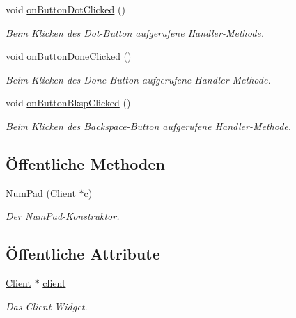 \begin{DoxyCompactItemize}
void \hyperlink{class_num_pad_a153332f9a9b050037329d054d8cac6ae}{on\+Button\+Dot\+Clicked} ()
\begin{DoxyCompactList}\small\item\em Beim Klicken des Dot-\/\+Button aufgerufene Handler-\/\+Methode. \end{DoxyCompactList}\item 
\hypertarget{class_num_pad_abc4841a30a7777e207aebeb6020d9194}{}\label{class_num_pad_abc4841a30a7777e207aebeb6020d9194} 
void \hyperlink{class_num_pad_abc4841a30a7777e207aebeb6020d9194}{on\+Button\+Done\+Clicked} ()
\begin{DoxyCompactList}\small\item\em Beim Klicken des Done-\/\+Button aufgerufene Handler-\/\+Methode. \end{DoxyCompactList}\item 
\hypertarget{class_num_pad_a8e5af4566f4c3e5574a6867877ee795b}{}\label{class_num_pad_a8e5af4566f4c3e5574a6867877ee795b} 
void \hyperlink{class_num_pad_a8e5af4566f4c3e5574a6867877ee795b}{on\+Button\+Bksp\+Clicked} ()
\begin{DoxyCompactList}\small\item\em Beim Klicken des Backspace-\/\+Button aufgerufene Handler-\/\+Methode. \end{DoxyCompactList}\end{DoxyCompactItemize}
\subsection*{Öffentliche Methoden}
\begin{DoxyCompactItemize}
\item 
\hyperlink{class_num_pad_ac35bfd6bb99a182c9073d80a09f3baf9}{Num\+Pad} (\hyperlink{class_client}{Client} $\ast$c)
\begin{DoxyCompactList}\small\item\em Der Num\+Pad-\/\+Konstruktor. \end{DoxyCompactList}\end{DoxyCompactItemize}
\subsection*{Öffentliche Attribute}
\begin{DoxyCompactItemize}
\item 
\hypertarget{class_num_pad_aeba02dbc3ca834bbd75f817855f5ecfb}{}\label{class_num_pad_aeba02dbc3ca834bbd75f817855f5ecfb} 
\hyperlink{class_client}{Client} $\ast$ \hyperlink{class_num_pad_aeba02dbc3ca834bbd75f817855f5ecfb}{client}
\begin{DoxyCompactList}\small\item\em Das Client-\/\+Widget. \end{DoxyCompactList}\end{DoxyCompactItemize}


